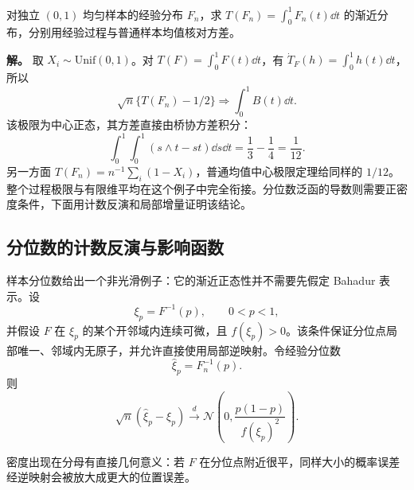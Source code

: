 \begin{exbox}[均匀经验过程的积分泛函]
对独立 $(0,1)$ 均匀样本的经验分布 $F_n$，求 $T(F_n)=\int_0^1F_n(t)\dd t$ 的渐近分布，分别用经验过程与普通样本均值核对方差。

\textbf{解。} 取 $X_i\sim\mathrm{Unif}(0,1)$。对 $T(F)=\int_0^1F(t)\dd t$，有 $\dot T_F(h)=\int_0^1h(t)\dd t$，所以
\[
 \sqrt n\{T(F_n)-1/2\}\Rightarrow\int_0^1B(t)\dd t.
\]
该极限为中心正态，其方差直接由桥协方差积分：
\[
 \int_0^1\!\int_0^1(s\wedge t-st)\dd s\dd t=\frac13-\frac14=\frac1{12}.
\]
另一方面 $T(F_n)=n^{-1}\sum_i(1-X_i)$，普通均值中心极限定理给同样的 $1/12$。整个过程极限与有限维平均在这个例子中完全衔接。分位数泛函的导数则需要正密度条件，下面用计数反演和局部增量证明该结论。
\end{exbox}


\subsection{分位数的计数反演与影响函数}
\begin{theorem}[样本分位数的渐近正态性]
样本分位数给出一个非光滑例子：它的渐近正态性并不需要先假定 Bahadur 表示。设
\[
 \xi_p=F^{-1}(p),\qquad 0<p<1,
\]
并假设 $F$ 在 $\xi_p$ 的某个开邻域内连续可微，且 $f(\xi_p)>0$。该条件保证分位点局部唯一、邻域内无原子，并允许直接使用局部逆映射。令经验分位数
\[
 \widehat\xi_p=F_n^{-1}(p).
\]
则
\begin{equation}\label{eq:math-stat-quantile-asymptotic-normal}
 \sqrt n(\widehat\xi_p-\xi_p)
 \xrightarrow{d}
 \mathcal N\!\left(0,
 \frac{p(1-p)}{f(\xi_p)^2}\right).
\end{equation}
\end{theorem}
密度出现在分母有直接几何意义：若 $F$ 在分位点附近很平，同样大小的概率误差经逆映射会被放大成更大的位置误差。

